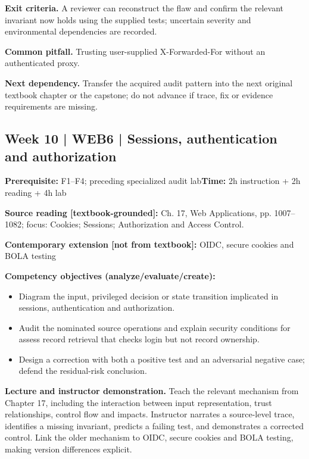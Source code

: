 \documentclass[10pt,letterpaper]{article}
\begin{document}
\textbf{Exit criteria.} A reviewer can reconstruct the flaw and confirm the relevant invariant now holds using the supplied tests; uncertain severity and environmental dependencies are recorded.

\textbf{Common pitfall.} Trusting user-supplied X-Forwarded-For without an authenticated proxy.

\textbf{Next dependency.} Transfer the acquired audit pattern into the next original textbook chapter or the capstone; do not advance if trace, fix or evidence requirements are missing.

\subsection{Week 10 | WEB6 | Sessions, authentication and authorization}
\textbf{Prerequisite:} F1--F4; preceding specialized audit lab\hfill\textbf{Time:} 2h instruction + 2h reading + 4h lab

\textbf{Source reading [textbook-grounded]:} Ch. 17, Web Applications, pp. 1007--1082; focus: Cookies; Sessions; Authorization and Access Control.

\textbf{Contemporary extension [not from textbook]:} OIDC, secure cookies and BOLA testing

\textbf{Competency objectives (analyze/evaluate/create):}
\begin{itemize}[leftmargin=*,itemsep=2pt]
\item Diagram the input, privileged decision or state transition implicated in sessions, authentication and authorization.
\item Audit the nominated source operations and explain security conditions for assess record retrieval that checks login but not record ownership.
\item Design a correction with both a positive test and an adversarial negative case; defend the residual-risk conclusion.
\end{itemize}
\textbf{Lecture and instructor demonstration.} Teach the relevant mechanism from Chapter 17, including the interaction between input representation, trust relationships, control flow and impacts. Instructor narrates a source-level trace, identifies a missing invariant, predicts a failing test, and demonstrates a corrected control. Link the older mechanism to OIDC, secure cookies and BOLA testing, making version differences explicit.
\end{document}
